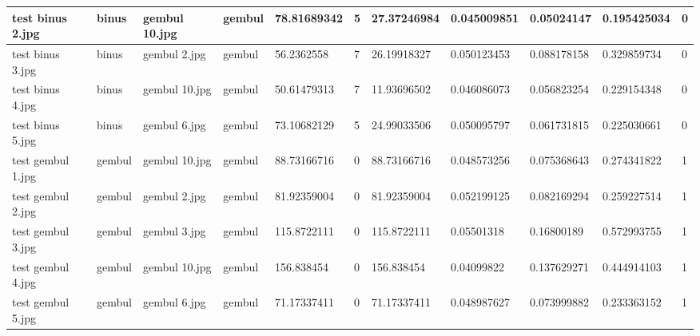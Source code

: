 \begin{landscape}
\begin{longtable}{|p{2cm}|p{1.5cm}|p{2cm}|p{1.5cm}|p{2cm}|p{1cm}|p{2cm}|p{2cm}|p{2cm}|p{2cm}|p{1cm}|}
		test binus 2.jpg     & binus            & gembul 10.jpg         & gembul                      & 78.81689342           & 5                       & 27.37246984                & 0.045009851           & 0.05024147            & 0.195425034              & 0                \\ \hline
		test binus 3.jpg     & binus            & gembul 2.jpg          & gembul                      & 56.2362558            & 7                       & 26.19918327                & 0.050123453           & 0.088178158           & 0.329859734              & 0                \\ \hline
		test binus 4.jpg     & binus            & gembul 10.jpg         & gembul                      & 50.61479313           & 7                       & 11.93696502                & 0.046086073           & 0.056823254           & 0.229154348              & 0                \\ \hline
		test binus 5.jpg     & binus            & gembul 6.jpg          & gembul                      & 73.10682129           & 5                       & 24.99033506                & 0.050095797           & 0.061731815           & 0.225030661              & 0                \\ \hline
		test gembul 1.jpg    & gembul           & gembul 10.jpg         & gembul                      & 88.73166716           & 0                       & 88.73166716                & 0.048573256           & 0.075368643           & 0.274341822              & 1                \\ \hline
		test gembul 2.jpg    & gembul           & gembul 2.jpg          & gembul                      & 81.92359004           & 0                       & 81.92359004                & 0.052199125           & 0.082169294           & 0.259227514              & 1                \\ \hline
		test gembul 3.jpg    & gembul           & gembul 3.jpg          & gembul                      & 115.8722111           & 0                       & 115.8722111                & 0.05501318            & 0.16800189            & 0.572993755              & 1                \\ \hline
		test gembul 4.jpg    & gembul           & gembul 10.jpg         & gembul                      & 156.838454            & 0                       & 156.838454                 & 0.04099822            & 0.137629271           & 0.444914103              & 1                \\ \hline
		test gembul 5.jpg    & gembul           & gembul 6.jpg          & gembul                      & 71.17337411           & 0                       & 71.17337411                & 0.048987627           & 0.073999882           & 0.233363152              & 1                \\ \hline

\end{longtable}
\end{landscape}
